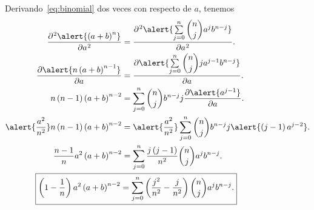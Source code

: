 \begin{frame}
	Derivando~\eqref{eq:binomial} dos veces con respecto de $a$,
	tenemos
	\begin{align}
		\diffp[2]{
			\alert{
				\left(a+b\right)^{n}
			}
		}{a}                   & =
		\diffp[2]{
			\alert{
				\sum\limits_{j=0}^{n}
				\dbinom{n}{j}
				a^{j}
				b^{n-j}
			}
		}{a}.   \notag             \\
		\diffp{
			\alert{
				n\left(a+b\right)^{n-1}
			}
		}{a}                   & =
		\diffp{
			\alert{
				\sum\limits_{j=0}^{n}
				\dbinom{n}{j}
				ja^{j-1}
				b^{n-j}
			}
		}{a}.         \notag       \\
		n\left(n-1\right)
		\left(a+b\right)^{n-2} & =
		\sum\limits_{j=0}^{n}
		\dbinom{n}{j}
		b^{n-j}
		j
		\diffp{
			\alert{
				a^{j-1}
			}
		}{a}.               \notag \\
		\alert{
			\dfrac{a^{2}}{n^{2}}
		}
		n\left(n-1\right)
		\left(a+b\right)^{n-2} & =
		\alert{
			\dfrac{a^{2}}{n^{2}}
		}
		\sum\limits_{j=0}^{n}
		\dbinom{n}{j}
		b^{n-j}
		j
		\alert{
			\left(j-1\right)
			a^{j-2}
		}.                \notag   \\
		\dfrac{n-1}{n}
		a^{2}
		\left(a+b\right)^{n-2}
		                       & =
		\sum\limits_{j=0}^{n}
		\dfrac{j\left(j-1\right)}{n^{2}}
		\dbinom{n}{j}
		a^{j}
		b^{n-j}.          \notag   \\
		\label{eq:binomial_II}
		\Aboxed{
			\left(1-\dfrac{1}{n}\right)
			a^{2}
			\left(a+b\right)^{n-2}
		                       & =
			\sum\limits_{j=0}^{n}
			\left(
			\dfrac{j^{2}}{n^{2}}-
			\dfrac{j}{n^{2}}
			\right)
			\dbinom{n}{j}
			a^{j}
			b^{n-j}.
		}
	\end{align}
\end{frame}

